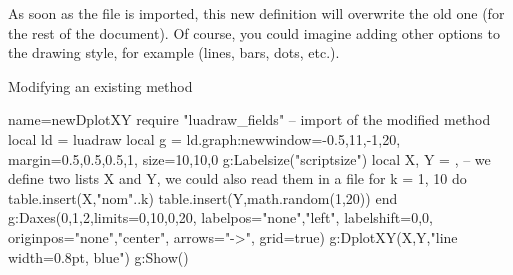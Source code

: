 As soon as the file is imported, this new definition will overwrite the old one (for the rest of the document). Of course, you could imagine adding other options to the drawing style, for example (lines, bars, dots, etc.).

\begin{demo}{Modifying an existing method}
\begin{luadraw}{name=newDplotXY}
require "luadraw_fields" -- import of the modified method
local ld = luadraw
local g = ld.graph:new{window={-0.5,11,-1,20}, margin={0.5,0.5,0.5,1}, size={10,10,0}}
g:Labelsize("scriptsize")
local X, Y = {}, {} -- we define two lists X and Y, we could also read them in a file
for k = 1, 10 do
    table.insert(X,"nom"..k)
    table.insert(Y,math.random(1,20))
end
g:Daxes({0,1,2},{limits={{0,10},{0,20}}, labelpos={"none","left"},
    labelshift={0,0}, originpos={"none","center"}, arrows="->", grid=true})
g:DplotXY(X,Y,"line width=0.8pt, blue")
g:Show()
\end{luadraw}
\end{demo}

